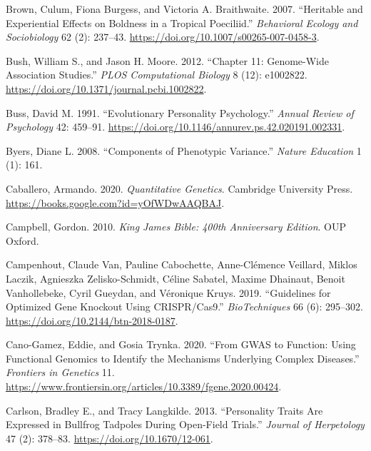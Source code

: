 \documentclass[
]{book}
\newlength{\cslhangindent}
\newlength{\cslentryspacingunit} %
\newenvironment{CSLReferences}[2] %
 {%
  \setlength{\parindent}{0pt}
  \ifodd #1
  \let\oldpar\par
  \def\par{\hangindent=\cslhangindent\oldpar}
  \fi
  \setlength{\parskip}{#2\cslentryspacingunit}
 }%
 {}
\begin{document}
\begin{CSLReferences}{1}{0}
\leavevmode{}%
Brown, Culum, Fiona Burgess, and Victoria A. Braithwaite. 2007. {``Heritable and Experiential Effects on Boldness in a Tropical Poeciliid.''} \emph{Behavioral Ecology and Sociobiology} 62 (2): 237--43. \url{https://doi.org/10.1007/s00265-007-0458-3}.

\leavevmode{}%
Bush, William S., and Jason H. Moore. 2012. {``Chapter 11: {Genome-Wide Association Studies}.''} \emph{PLOS Computational Biology} 8 (12): e1002822. \url{https://doi.org/10.1371/journal.pcbi.1002822}.

\leavevmode{}%
Buss, David M. 1991. {``Evolutionary Personality Psychology.''} \emph{Annual Review of Psychology} 42: 459--91. \url{https://doi.org/10.1146/annurev.ps.42.020191.002331}.

\leavevmode{}%
Byers, Diane L. 2008. {``Components of Phenotypic Variance.''} \emph{Nature Education} 1 (1): 161.

\leavevmode{}%
Caballero, Armando. 2020. \emph{Quantitative {Genetics}}. {Cambridge University Press}. \url{https://books.google.com?id=yOfWDwAAQBAJ}.

\leavevmode{}%
Campbell, Gordon. 2010. \emph{King {James Bible}: 400th {Anniversary Edition}}. {OUP Oxford}.

\leavevmode{}%
Campenhout, Claude Van, Pauline Cabochette, Anne-Clémence Veillard, Miklos Laczik, Agnieszka Zelisko-Schmidt, Céline Sabatel, Maxime Dhainaut, Benoit Vanhollebeke, Cyril Gueydan, and Véronique Kruys. 2019. {``Guidelines for Optimized Gene Knockout Using {CRISPR}/{Cas9}.''} \emph{BioTechniques} 66 (6): 295--302. \url{https://doi.org/10.2144/btn-2018-0187}.

\leavevmode{}%
Cano-Gamez, Eddie, and Gosia Trynka. 2020. {``From {GWAS} to {Function}: {Using Functional Genomics} to {Identify} the {Mechanisms Underlying Complex Diseases}.''} \emph{Frontiers in Genetics} 11. \url{https://www.frontiersin.org/articles/10.3389/fgene.2020.00424}.

\leavevmode{}%
Carlson, Bradley E., and Tracy Langkilde. 2013. {``Personality {Traits Are Expressed} in {Bullfrog Tadpoles} During {Open-Field Trials}.''} \emph{Journal of Herpetology} 47 (2): 378--83. \url{https://doi.org/10.1670/12-061}.


\end{CSLReferences}
\end{document}
